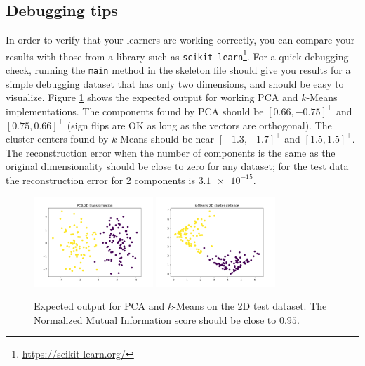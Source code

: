 \documentclass{article}
\begin{document}
\subsection*{Debugging tips}
In order to verify that your learners are working correctly, you can compare your results with those from a library such as \texttt{scikit-learn}\footnote{\url{https://scikit-learn.org/}}. For a quick debugging check, running the \texttt{main} method in the skeleton file should give you results for a simple debugging dataset that has only two dimensions, and should be easy to visualize. Figure \ref{fig:test-figs} shows the expected output for working PCA and \(k\)-Means implementations. The components found by PCA should be \([0.66, -0.75]^\top\) and \([0.75,0.66]^\top\) (sign flips are OK as long as the vectors are orthogonal). The cluster centers found by \(k\)-Means should be near \([-1.3,-1.7]^\top\) and \([1.5,1.5]^\top\). The reconstruction error when the number of components is the same as the original dimensionality should be close to zero for any dataset; for the test data the reconstruction error for 2 components is \(\num{3.1e-15}\).
\begin{figure}
\centering
\includegraphics[width=0.4\textwidth]{pca-test-data}
\includegraphics[width=0.4\textwidth]{km-test-data}
\caption{Expected output for PCA and \(k\)-Means on the 2D test dataset. The Normalized Mutual Information score should be close to \(0.95\).}
\label{fig:test-figs}
\end{figure}
\end{document}
